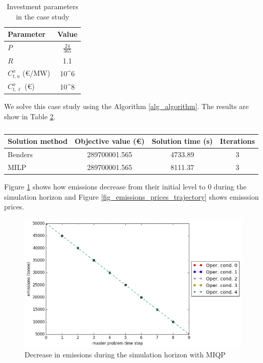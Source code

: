 \documentclass[final]{IEEEtran}
\begin{document}
{\begin{table}[htpb]
\centering
\begin{tabular}{l| c} \hline
Parameter 						& Value  \\ \hline
$P$ 									& $\frac{24}{365}$ \\
$R$										& 1.1		\\
$C^x_{t, u}$ (€/MW)		& 10^6    \\
$C^x_{t, \ell}$ (€)		& 10^8	\\
\end{tabular}
\caption{Investment parameters in the case study}
\label{table_investment_parameters}
\end{table}

We solve this case study using the Algorithm \ref{alg_algorithm}. The results are show in Table \ref{table_results}.

\begin{table}[htpb]
\centering
\begin{tabular}{l| c c c} \hline
Solution method 	& Objective value (€) 	& Solution time (s) & Iterations \\ \hline
Benders						& 289700001.565 				& 4733.89					  & 3				 \\
MILP							& 289700001.565 				& 8111.37					  & 3				 \\
\end{tabular}
\caption{}
\label{table_results}
\end{table}

Figure \ref{fig_emissions_trajectory} shows how emissions decrease from their initial level to 0 during the simulation horizon and Figure \ref{fig_emissions_prices_trajectory} shows emisssion prices.

\begin{figure}[htpb]
  \centering
  \includegraphics[width=\linewidth]{emissions_trajectory.png}
  \caption{Decrease in emissions during the simulation horizon with MIQP}
  \label{fig_emissions_trajectory}
\end{figure}

}
\end{document}

